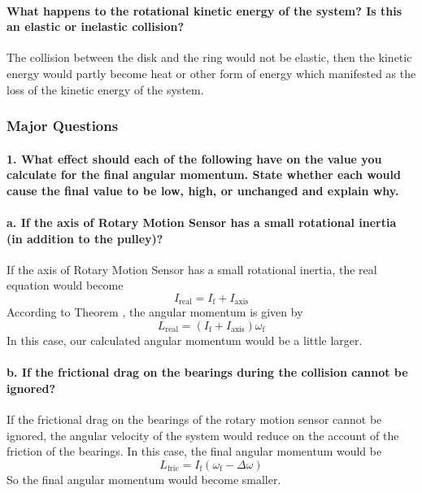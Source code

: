 \paragraph{What happens to the rotational kinetic energy of the system? Is this an elastic or inelastic collision?}The collision between the disk and the ring would not be elastic, then the kinetic energy would partly become heat or other form of energy which manifested as the loss of the kinetic energy of the system.

\subsubsection{Major Questions}
\paragraph{1. What effect should each of the following have on the value you calculate for the final angular momentum. State whether each would cause the final value to be low, high, or unchanged and explain why.}
\paragraph{a. If the axis of Rotary Motion Sensor has a small rotational inertia (in addition to the pulley)?}If the axis of Rotary Motion Sensor has a small rotational inertia, the real equation would become
\begin{equation*}
  I_{\text{real}}=I_{\text{f}}+I_{\text{axis}}
\end{equation*}
According to Theorem , the angular momentum is given by
\begin{equation*}
  L_{\text{real}}=(I_{\text{f}}+I_{\text{axis}})\omega_{\text{f}}
\end{equation*}
In this case, our calculated angular momentum would be a little larger.
\paragraph{b. If the frictional drag on the bearings during the collision cannot be ignored?}If the frictional drag on the bearings of the rotary motion sensor cannot be ignored, the angular velocity of the system would reduce on the account of the friction of the bearings. In this case, the final angular momentum would be
\begin{equation*}
  L_{\text{fric}}=I_{\text{f}}(\omega_{\text{f}}-\Delta\omega)
\end{equation*}
So the final angular momentum would become smaller.

